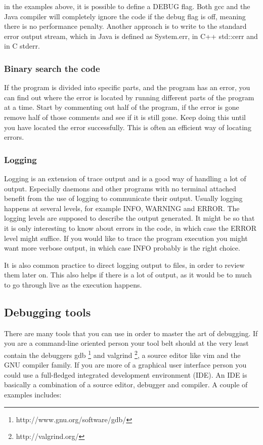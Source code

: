 \documentclass[11pt,a4paper,twoside]{article}
\begin{document}
 in the examples above, it is possible to define a DEBUG flag.
Both gcc and the Java compiler will completely ignore the code if the debug
flag is off, meaning there is no performance penalty. Another approach is to
write to the standard error output stream, which in Java is defined as
System.err, in C++ std::cerr and in C stderr.

\subsubsection{Binary search the code}
If the program is divided into specific parts, and the program has an error,
you can find out where the error is located by running different parts of the
program at a time. Start by commenting out half of the program, if the error is
gone remove half of those comments and see if it is still gone. Keep doing this
until you have located the error successfully. This is often an efficient way
of locating errors.

\subsubsection{Logging}

Logging is an extension of trace output and is a good way of handling a lot of
output. Especially daemons and other programs with no terminal attached benefit
from the use of logging to communicate their output. Usually logging happens at
several levels, for example \textsc{INFO}, \textsc{WARNING} and \textsc{ERROR}.
The logging levels are supposed to describe the output generated. It might be
so that it is only interesting to know about errors in the code, in which case
the \textsc{ERROR} level might suffice. If you would like to trace the program
execution you might want more verbose output, in which case \textsc{INFO}
probably is the right choice. 

It is also common practice to direct logging output to files, in order to
review them later on. This also helps if there is a lot of output, as it would
be to much to go through live as the execution happens.

\subsection{Debugging tools}

There are many tools that you can use in order to master the art of debugging.
If you are a command-line oriented person your tool belt should at the very
least contain the debuggers gdb \footnote{http://www.gnu.org/software/gdb/} and
valgrind \footnote{http://valgrind.org/}, a source editor like vim and the GNU
compiler family. If you are more of a graphical user interface person you could
use a full-fledged integrated development environment (IDE). An IDE is
basically a combination of a source editor, debugger and compiler. A couple of
examples includes:
\end{document}
